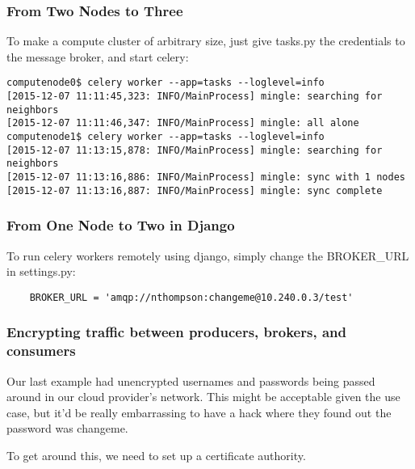 \documentclass[9pt]{beamer}
\begin{document}
\begin{frame}[fragile]
  \frametitle{From Two Nodes to Three}
  To make a compute cluster of arbitrary size, just give tasks.py the credentials to the message broker, and start celery:
  \begin{verbatim}
computenode0$ celery worker --app=tasks --loglevel=info
[2015-12-07 11:11:45,323: INFO/MainProcess] mingle: searching for neighbors
[2015-12-07 11:11:46,347: INFO/MainProcess] mingle: all alone
computenode1$ celery worker --app=tasks --loglevel=info
[2015-12-07 11:13:15,878: INFO/MainProcess] mingle: searching for neighbors
[2015-12-07 11:13:16,886: INFO/MainProcess] mingle: sync with 1 nodes
[2015-12-07 11:13:16,887: INFO/MainProcess] mingle: sync complete
  \end{verbatim}
\end{frame}

\begin{frame}[fragile]
  \frametitle{From One Node to Two in Django}
  To run celery workers remotely using django, simply change the BROKER\_URL in settings.py:
  \begin{verbatim}
    BROKER_URL = 'amqp://nthompson:changeme@10.240.0.3/test'
  \end{verbatim}
\end{frame}

\begin{frame}[fragile]
\frametitle{Encrypting traffic between producers, brokers, and consumers}
Our last example had unencrypted usernames and passwords being passed around in our cloud provider's network. This might be acceptable given the use case, but it'd be really embarrassing to have a hack where they found out the password was changeme.

To get around this, we need to set up a certificate authority.
\end{frame}
\end{document}
